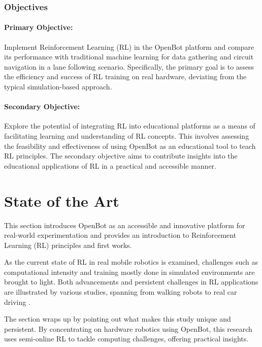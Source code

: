 \documentclass[12pt]{report}
\begin{document}
\subsection{Objectives}


\subsubsection{Primary Objective:}

Implement Reinforcement Learning (RL) in the OpenBot platform and compare its performance with traditional machine learning for data gathering and circuit navigation in a lane following scenario. Specifically, the primary goal is to assess the efficiency and success of RL training on real hardware, deviating from the typical simulation-based approach.

\subsubsection{Secondary Objective:}

Explore the potential of integrating RL into educational platforms as a means of facilitating learning and understanding of RL concepts. This involves assessing the feasibility and effectiveness of using OpenBot as an educational tool to teach RL principles. The secondary objective aims to contribute insights into the educational applications of RL in a practical and accessible manner.

\chapter{State of the Art}
\label{sub:State_of_the_art}
This section introduces OpenBot as an accessible and innovative platform for real-world experimentation and provides an introduction to Reinforcement Learning (RL) principles and first works. 


As the current state of RL in real mobile robotics is examined, challenges such as computational intensity and training mostly done in simulated environments are brought to light. Both advancements and persistent challenges in RL applications are illustrated by various studies, spanning from walking robots \cite{bib:walk} to real car driving \cite{bib:realcar}. 


The section wraps up by pointing out what makes this study unique and persistent. By concentrating on hardware robotics using OpenBot, this research uses semi-online RL to tackle computing challenges, offering practical insights.
\end{document}
